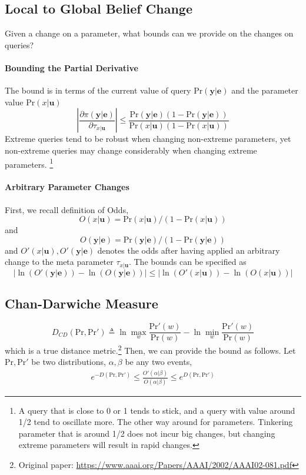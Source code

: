 \documentclass[11pt]{article}
\newcommand{\be}{\mathbf{e}}
\newcommand{\bu}{\mathbf{u}}
\newcommand{\by}{\mathbf{y}}
\newcommand{\pr}{\mathrm{Pr}}
\begin{document}
\subsection{Local to Global Belief Change}
Given a change on a parameter, what bounds can we provide on the changes on queries? 

\paragraph{Bounding the Partial Derivative} The bound is in terms of the current value of query $ \pr(\by | \be)$ and the parameter value $ \pr(x| \bu)$
\begin{equation}
	\left| \frac{\partial \pi(\by | \be)}{\partial \tau_{x |\bu}} \right| \leq 
	\frac{\pr(\by | \be) (1 - \pr(\by | \be))}{\pr(x | \bu) (1 - \pr(x | \bu))}
\end{equation}
Extreme queries tend to be robust when changing non-extreme parameters, yet non-extreme queries may change considerably when changing extreme parameters. \footnote{A query that is close to 0 or 1 tends to stick, and a query with value around 1/2 tend to oscillate more. The other way around for parameters. Tinkering parameter that is around 1/2 does not incur big changes, but changing extreme parameters will result in rapid changes.}

\paragraph{Arbitrary Parameter Changes}
First, we recall definition of Odds, 
\begin{equation}
	O(x | \bu) = \pr(x |\bu) / (1 - \pr( x | \bu))
\end{equation}
and \begin{equation}
	O(\by | \be) = \pr( \by | \be) / (1 - \pr( \by | \be))
\end{equation}
and $O'(x | \bu), O'(\by| \be)$ denotes the odds after having applied an arbitrary change to the meta parameter $\tau_{x |\bu}$. The bounds can be specified as 
\begin{equation}
	\left| \ln (O'(\by | \be)) - \ln (O (\by |\be) )\right| \leq \left|\ln (O'( x |\bu)) - \ln ( O(x | \bu))\right| 
\end{equation}

\subsection{Chan-Darwiche Measure}
\begin{equation}
	D_{CD}(\pr, \pr') \triangleq
	\ln\max_w \frac{\pr'(w)}{\pr(w)} - \ln\min_w \frac{\pr'(w)}{\pr(w) }
\end{equation}
which is a true distance metric.\footnote{Original paper: \url{https://www.aaai.org/Papers/AAAI/2002/AAAI02-081.pdf}} Then, we can provide the bound as follows. Let $\pr, \pr'$ be two distributions, $\alpha, \beta$ be any two events, 
\begin{align}
	e^{-D(\pr, \pr')} \leq  \frac{O'(\alpha | \beta)}{O(\alpha | \beta)} \leq e^{D(\pr, \pr')}
\end{align}
\end{document}
